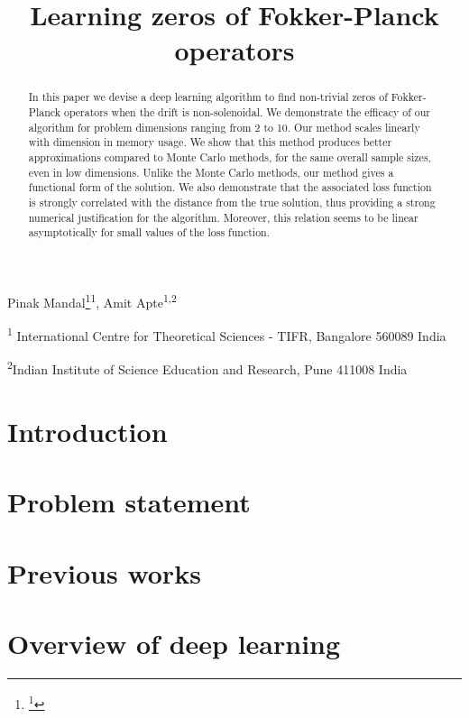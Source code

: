 \documentclass[reqno]{siamart220329}
\title{Learning zeros of Fokker-Planck operators}
\makeatletter
\newcommand{\authorfootnotes}{\renewcommand\thefootnote{\@fnsymbol\c@footnote}}%
\makeatother
\begin{document}
\maketitle

 {\normalsize
 \centering
  \authorfootnotes
  Pinak Mandal\footnote{\thanks{Corresponding author: \texttt{pinak.mandal@icts.res.in}}}\textsuperscript{1}, Amit Apte\textsuperscript{1,2}

  \textsuperscript{1} International Centre for Theoretical Sciences - TIFR, Bangalore 560089 India \par
  \textsuperscript{2}Indian Institute of Science Education and Research, Pune 411008 India\par \bigskip}

\begin{abstract}
In this paper we devise a deep learning algorithm to find non-trivial zeros of Fokker-Planck operators when the drift is non-solenoidal. We demonstrate the efficacy of our algorithm for problem dimensions ranging from 2 to 10. Our method scales linearly with dimension in memory usage. We show that this method produces better approximations compared to Monte Carlo methods, for the same overall sample sizes, even in low dimensions. Unlike the Monte Carlo methods, our method gives a functional form of the solution. We also demonstrate that the associated loss function is strongly correlated with the distance from the true solution, thus providing a strong numerical justification for the algorithm. Moreover, this relation seems to be linear asymptotically for small values of the loss function.
\end{abstract}




\section{Introduction}\label{sec-intro}

\section{Problem statement}
\label{sec-prob}

\section{Previous works}\label{sec-prev-work}

\section{Overview of deep learning}
\label{sec-learning}

\end{document}
